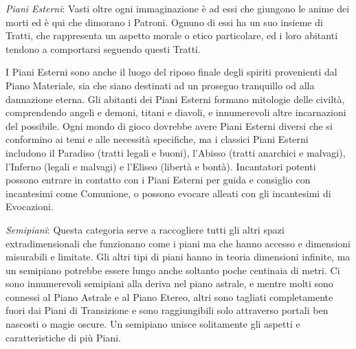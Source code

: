 \documentclass[a4paper,twoside,openany]{book}
\begin{document}
\begin{multicols}{2}
\begin{itemize}[leftmargin=*]
\end{itemize}




\emph{Piani Esterni}: Vasti oltre ogni immaginazione è ad essi che giungono le anime dei morti ed è qui che dimorano i Patroni. Ognuno di essi ha un suo insieme di Tratti, che rappresenta un aspetto morale o etico particolare, ed i loro abitanti tendono a comportarsi seguendo questi Tratti.

I Piani Esterni sono anche il luogo del riposo finale degli spiriti provenienti dal Piano Materiale, sia che siano destinati ad un proseguo tranquillo od alla dannazione eterna. Gli abitanti dei Piani Esterni formano mitologie delle civiltà, comprendendo angeli e demoni, titani e diavoli, e innumerevoli altre incarnazioni del possibile. Ogni mondo di gioco dovrebbe avere Piani Esterni diversi che si conformino ai temi e alle necessità specifiche, ma i classici Piani Esterni includono il Paradiso (tratti legali e buoni), l'Abisso (tratti anarchici e malvagi), l'Inferno (legali e malvagi) e l'Eliseo (libertà e bontà). Incantatori potenti possono entrare in contatto con i Piani Esterni per guida e consiglio con incantesimi come Comunione, o possono evocare alleati con gli incantesimi di Evocazioni.

\emph{Semipiani}: Questa categoria serve a raccogliere tutti gli altri spazi extradimensionali che funzionano come i piani ma che hanno accesso e dimensioni misurabili e limitate. Gli altri tipi di piani hanno in teoria dimensioni infinite, ma un semipiano potrebbe essere lungo anche soltanto poche centinaia di metri. Ci sono innumerevoli semipiani alla deriva nel piano astrale, e mentre molti sono connessi al Piano Astrale e al Piano Etereo, altri sono tagliati completamente fuori dai Piani di Transizione e sono raggiungibili solo attraverso portali ben nascosti o magie oscure. Un semipiano unisce solitamente gli aspetti e caratteristiche di più Piani.


\end{multicols}
\end{document}
